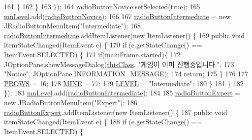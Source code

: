 \begin{DoxyCode}
161                 \}
162             \}
163         \});
164         \hyperlink{classpkg_1_1main_frame_a13b463f756bd15fbba342d2a810b0953}{radioButtonNovice}.setSelected(\textcolor{keyword}{true});
165         \hyperlink{classpkg_1_1main_frame_adceefa443b0c2344aa1ad15f8da92dac}{mnLevel}.add(\hyperlink{classpkg_1_1main_frame_a13b463f756bd15fbba342d2a810b0953}{radioButtonNovice});
166         
167         \hyperlink{classpkg_1_1main_frame_ae0f421df54f124f20ade63f63bf53ccc}{radioButtonIntermediate} = \textcolor{keyword}{new} JRadioButtonMenuItem(\textcolor{stringliteral}{"Intermediate"});
168         \hyperlink{classpkg_1_1main_frame_ae0f421df54f124f20ade63f63bf53ccc}{radioButtonIntermediate}.addItemListener(\textcolor{keyword}{new} ItemListener() \{
169             \textcolor{keyword}{public} \textcolor{keywordtype}{void} itemStateChanged(ItemEvent e) \{
170                 \textcolor{keywordflow}{if} (e.getStateChange() == ItemEvent.SELECTED) \{
171                     \textcolor{keywordflow}{if}(\hyperlink{classpkg_1_1main_frame_a0edb10d75697656c940f3b5e3ba7d9ef}{mainFrame}.started)\{
172                         JOptionPane.showMessageDialog(\hyperlink{classpkg_1_1main_frame_aa7857342de44fb7ddfa5d6e2685f71fb}{thisClass}, \textcolor{stringliteral}{"게임이 이미 진행중입니다."},
173                                 \textcolor{stringliteral}{"Notice"}, JOptionPane.INFORMATION\_MESSAGE);
174                         \textcolor{keywordflow}{return};
175                     \}
176                     
177                     \hyperlink{classpkg_1_1main_frame_a6d9a76db81895214a2acaab598dc2a7c}{PROWS} = 16;
178                     \hyperlink{classpkg_1_1main_frame_a2d3b62dc427e3bfd3247b51456d78882}{MINE} = 77;
179                     \hyperlink{classpkg_1_1main_frame_af08a1a3e5a422b15f9ebe173a386de24}{LEVEL} = \textcolor{stringliteral}{"Intermediate"};
180                 \}
181             \}
182         \});
183         \hyperlink{classpkg_1_1main_frame_adceefa443b0c2344aa1ad15f8da92dac}{mnLevel}.add(\hyperlink{classpkg_1_1main_frame_ae0f421df54f124f20ade63f63bf53ccc}{radioButtonIntermediate});
184         
185         \hyperlink{classpkg_1_1main_frame_a3c5879fc83a0488e3cf3d42dda313c13}{radioButtonExpert} = \textcolor{keyword}{new} JRadioButtonMenuItem(\textcolor{stringliteral}{"Expert"});
186         \hyperlink{classpkg_1_1main_frame_a3c5879fc83a0488e3cf3d42dda313c13}{radioButtonExpert}.addItemListener(\textcolor{keyword}{new} ItemListener() \{
187             \textcolor{keyword}{public} \textcolor{keywordtype}{void} itemStateChanged(ItemEvent e) \{
188                 \textcolor{keywordflow}{if} (e.getStateChange() == ItemEvent.SELECTED) \{

\end{DoxyCode}
